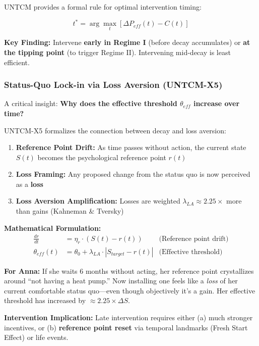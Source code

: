 UNTCM provides a formal rule for optimal intervention timing:

\begin{equation}
t^* = \arg\max_t \left[ \Delta P_{eff}(t) - C(t) \right]
\end{equation}

\textbf{Key Finding:} Intervene \textbf{early in Regime I} (before decay accumulates) or \textbf{at the tipping point} (to trigger Regime II). Intervening mid-decay is least efficient.

\subsubsection{Status-Quo Lock-in via Loss Aversion (UNTCM-X5)}

A critical insight: \textbf{Why does the effective threshold $\theta_{eff}$ increase over time?}

UNTCM-X5 formalizes the connection between decay and loss aversion:

\begin{enumerate}[nosep]
\item \textbf{Reference Point Drift:} As time passes without action, the current state $S(t)$ becomes the psychological reference point $r(t)$
\item \textbf{Loss Framing:} Any proposed change from the status quo is now perceived as a \textbf{loss}
\item \textbf{Loss Aversion Amplification:} Losses are weighted $\lambda_{LA} \approx 2.25\times$ more than gains (Kahneman \& Tversky)
\end{enumerate}

\textbf{Mathematical Formulation:}
\begin{align}
\frac{dr}{dt} &= \eta_r \cdot (S(t) - r(t)) & \text{(Reference point drift)} \\
\theta_{eff}(t) &= \theta_0 + \lambda_{LA} \cdot |S_{target} - r(t)| & \text{(Effective threshold)}
\end{align}

\textbf{For Anna:} If she waits 6 months without acting, her reference point crystallizes around ``not having a heat pump.'' Now installing one feels like a \textit{loss} of her current comfortable status quo---even though objectively it's a gain. Her effective threshold has increased by $\approx 2.25 \times \Delta S$.

\textbf{Intervention Implication:} Late intervention requires either (a) much stronger incentives, or (b) \textbf{reference point reset} via temporal landmarks (Fresh Start Effect) or life events.

